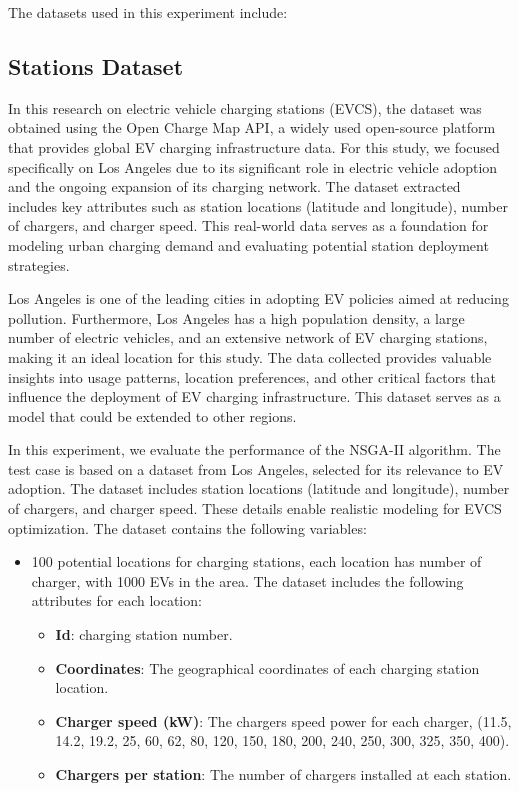 The datasets used in this experiment include:

\subsection{Stations Dataset}
In this research on electric vehicle charging stations (EVCS), the dataset was obtained using the Open Charge Map API, a widely used open-source platform that provides global EV charging infrastructure data\cite{openchargemap}. For this study, we focused specifically on Los Angeles due to its significant role in electric vehicle adoption and the ongoing expansion of its charging network. The dataset extracted includes key attributes such as station locations (latitude and longitude), number of chargers, and charger speed. This real-world data serves as a foundation for modeling urban charging demand and evaluating potential station deployment strategies.

Los Angeles is one of the leading cities in adopting EV policies aimed at reducing pollution. Furthermore, Los Angeles has a high population density, a large number of electric vehicles, and an extensive network of EV charging stations, making it an ideal location for this study. The data collected provides valuable insights into usage patterns, location preferences, and other critical factors that influence the deployment of EV charging infrastructure. This dataset serves as a model that could be extended to other regions.

In this experiment, we evaluate the performance of the NSGA-II algorithm. The test case is based on a dataset from Los Angeles, selected for its relevance to EV adoption. The dataset includes station locations (latitude and longitude), number of chargers, and charger speed. These details enable realistic modeling for EVCS optimization. The dataset contains the following variables:


\begin{itemize}
    \item 100 potential locations for charging stations, each location has number of charger, with 1000 EVs in the area. The dataset includes the following attributes for each location:
    \begin{itemize}
        \item \textbf{Id}: charging station number.
        \item \textbf{Coordinates}: The geographical coordinates of each charging station location.
        \item \textbf{Charger speed (kW)}: The chargers speed power for each charger, (11.5, 14.2, 19.2, 25, 60, 62, 80, 120, 150, 180, 200, 240, 250, 300, 325, 350, 400).
        \item \textbf{Chargers per station}: The number of chargers installed at each station.
    \end{itemize}
\end{itemize}



